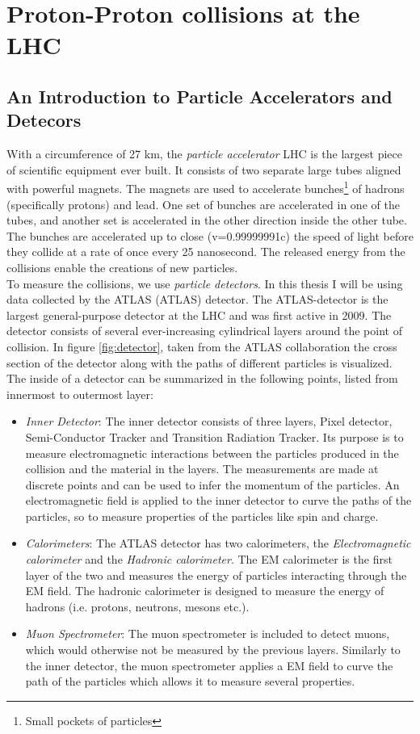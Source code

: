 \section{Proton-Proton collisions at the LHC}
\subsection{An Introduction to Particle Accelerators and Detecors}
With a circumference of 27 km, the \emph{particle accelerator} \ac{LHC} is the largest piece of scientific 
equipment ever built. It consists of two separate large tubes aligned with powerful magnets. The magnets are used 
to accelerate bunches\footnote{Small pockets of particles} of hadrons (specifically protons) and lead. One set 
of bunches are accelerated in one of the tubes, and another set is accelerated in the other direction inside the 
other tube. The bunches are accelerated up to close (v=0.99999991c) the speed of light before they collide at a 
rate of once every 25 nanosecond. The released energy from the collisions enable the creations of new particles.
\\
To measure the collisions, we use \emph{particle detectors}. In this thesis I will be using data collected by the 
\acs{ATLAS} (\acl{ATLAS}) detector. The \ac{ATLAS}-detector is the largest general-purpose detector at the \ac{LHC}
and was first active in 2009. The detector consists of several ever-increasing cylindrical layers around the point of 
collision. In figure \ref{fig:detector}, taken from the \ac{ATLAS} collaboration \cite{PDetector} the cross section 
of the detector along with the paths of different particles is visualized. The inside of a detector can be summarized 
in the following points, listed from innermost to outermost layer:
\begin{itemize}
    \item \emph{Inner Detector}: The inner detector consists of three layers, Pixel detector, Semi-Conductor Tracker 
          and Transition Radiation Tracker. Its purpose is to measure electromagnetic interactions between the particles 
          produced in the collision and the material in the layers. The measurements are made at discrete points and can be 
          used to infer the momentum of the particles. An electromagnetic field is applied to the inner detector
          to curve the paths of the particles, so to measure properties of the particles like spin and charge.  
    \item \emph{Calorimeters}: The ATLAS detector has two calorimeters, the \emph{Electromagnetic calorimeter} and the 
           \emph{Hadronic calorimeter}. The \ac{EM} calorimeter is the first layer of the two and measures the energy of 
           particles interacting through the \ac{EM} field. The hadronic calorimeter is designed to measure the energy of 
           hadrons (i.e. protons, neutrons, mesons etc.).
    \item \emph{Muon Spectrometer}: The muon spectrometer is included to detect muons, which would otherwise not be measured 
           by the previous layers. Similarly to the inner detector, the muon spectrometer applies a \ac{EM} field to 
           curve the path of the particles which allows it to measure several properties. 
\end{itemize}
